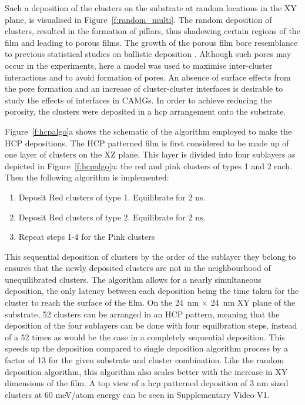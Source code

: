 \begin{changebar}
Such a deposition of the clusters on the substrate at random locations in the XY plane, is visualised in Figure~\ref{f:random_multi}. The random deposition of clusters, resulted in the formation of pillars, thus shadowing certain regions of the film and leading to porous films. The growth of the porous film bore resemblance to previous statistical studies on ballistic deposition \cite{Meakin1986}. Although such pores may occur in the experiments, here a model was used to maximise inter-cluster interactions and to avoid formation of pores. An absence of surface effects from the pore formation and an increase of cluster-cluster interfaces is desirable to study the effects of interfaces in CAMGs. In order to achieve reducing the porosity, the clusters were deposited in a \gls{hcp} arrangement onto the substrate. \par
\end{changebar}

Figure~\ref{f:hcpalgo}a shows the schematic of the algorithm employed to make the HCP depositions. The HCP patterned film is first considered to be made up of one layer of clusters on the XZ plane. This layer is divided into four sublayers as depicted in Figure~\ref{f:hcpalgo}a: the red and pink clusters of types 1 and 2 each. Then the following algorithm is implemented:

\begin{enumerate}[noitemsep]
	\item Deposit Red clusters of type 1. Equilibrate for 2 ns.
	\item Deposit Red clusters of type 2. Equilibrate for 2 ns.
	\item Repeat steps 1-4 for the Pink clusters
\end{enumerate}

This sequential deposition of clusters by the order of the sublayer they belong to ensures that the newly deposited clusters are not in the neighbourhood of unequilibrated clusters. The algorithm allows for a nearly simultaneous deposition, the only latency between each deposition being the time taken for the cluster to reach the surface of the film. On the \mbox{24 nm} $\times$ \mbox{24 nm} XY plane of the substrate, 52 clusters can be arranged in an HCP pattern, meaning that the deposition of the four sublayers can be done with four equilbration steps, instead of a 52 times as would be the case in a completely sequential deposition. This speeds up the deposition compared to single deposition algorithm process by a factor of 13 for the given substrate and cluster combination. Like the random deposition algorithm, this algorithm also scales better with the increase in XY dimensions of the film. A top view of a \gls{hcp} patterned deposition of 3 nm sized clusters at 60 meV/atom energy can be seen in Supplementary Video V1. \par

